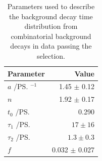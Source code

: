 \begin{table}[tbp]
\begin{center}
\begin{tabular}{lr}
\toprule \toprule
Parameter & Value \\
\midrule
$a$ /\ps$^{-1}$ & 1.45 $\pm$ 0.12\\
$n$ & 1.92 $\pm$ 0.17 \\
$t_{0}$ /\ps & 0.290 \\
$\tau_{1}$ /\ps & $17 \pm 16$  \\ 
$\tau_{2}$ /\ps & $1.3 \pm 0.3$ \\
$f$ & 0.032 $\pm$ 0.027 \\
\bottomrule \bottomrule
\end{tabular}
\vspace{0.7cm}             
\caption{Parameters used to describe the background decay time distribution from combinatorial background decays in data passing the \bhh selection.}
\label{tab:bkgparams}
\end{center}
\vspace{-1.0cm}                                                                                                                                               
\end{table}

